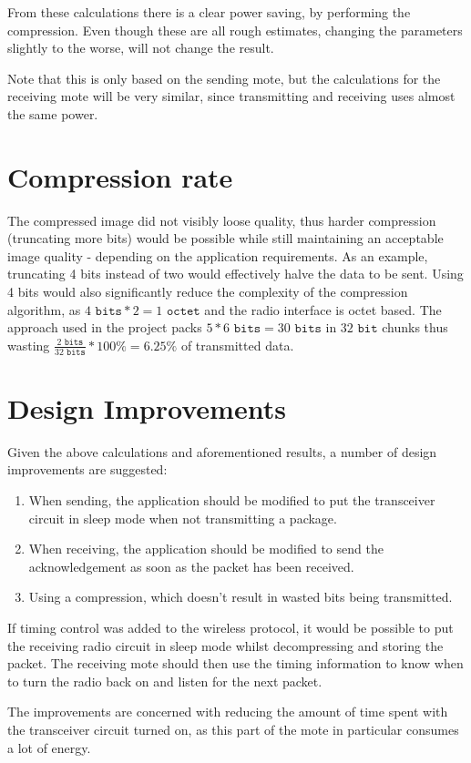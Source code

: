 From these calculations there is a clear power saving, by performing the compression. Even though these are all rough estimates, changing the parameters slightly to the worse, will not change the result.

Note that this is only based on the sending mote, but the calculations for the receiving mote will be very similar, since transmitting and receiving uses almost the same power. 

\section{Compression rate}

The compressed image did not visibly loose quality, thus harder compression (truncating more bits) would be possible while still maintaining an acceptable image quality - depending on the application requirements.
As an example, truncating 4 bits instead of two would effectively halve the data to be sent.
Using 4 bits would also significantly reduce the complexity of the compression algorithm, as $4 \texttt{ bits} * 2= 1 \texttt{ octet}$ and the radio interface is octet based.
The approach used in the project packs $5 * 6\texttt{ bits} = 30\texttt{ bits}$ in $32 \texttt{ bit}$ chunks thus wasting $\frac{2\texttt{ bits}}{32\texttt{ bits}}*100\% = 6.25\%$ of transmitted data.

\section{Design Improvements}

Given the above calculations and aforementioned results, a number of design improvements are suggested: 

\begin{enumerate}
\item When sending, the application should be modified to put the transceiver circuit in sleep mode when not transmitting a package. 
\item When receiving, the application should be modified to send the acknowledgement as soon as the packet has been received.
\item Using a compression, which doesn't result in wasted bits being transmitted. 
\end{enumerate} 

If timing control was added to the wireless protocol, it would be possible to put the receiving radio circuit in sleep mode whilst decompressing and storing the packet. The receiving mote should then use the timing information to know when to turn the radio back on and listen for the next packet.

The improvements are concerned with reducing the amount of time spent with the transceiver circuit turned on, as this part of the mote in particular consumes a lot of energy.  
